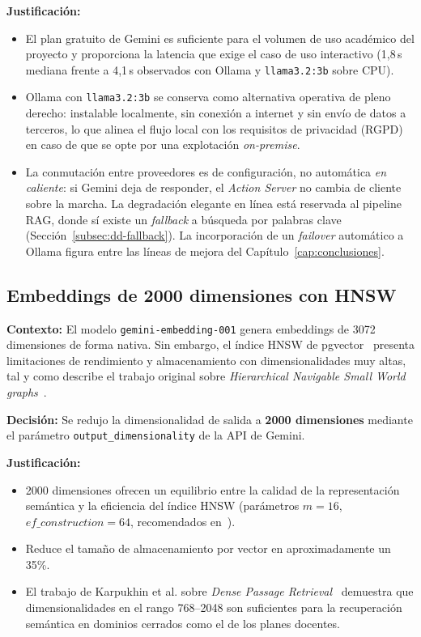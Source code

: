 \textbf{Justificación:}
\begin{itemize}
    \item El plan gratuito de Gemini es suficiente para el volumen de uso académico del proyecto y proporciona la latencia que exige el caso de uso interactivo (1,8\,s mediana frente a 4,1\,s observados con Ollama y \texttt{llama3.2:3b} sobre CPU).
    \item Ollama con \texttt{llama3.2:3b} se conserva como alternativa operativa de pleno derecho: instalable localmente, sin conexión a internet y sin envío de datos a terceros, lo que alinea el flujo local con los requisitos de privacidad (RGPD) en caso de que se opte por una explotación \textit{on-premise}.
    \item La conmutación entre proveedores es de configuración, no automática \textit{en caliente}: si Gemini deja de responder, el \textit{Action Server} no cambia de cliente sobre la marcha. La degradación elegante en línea está reservada al pipeline RAG, donde sí existe un \textit{fallback} a búsqueda por palabras clave (Sección~\ref{subsec:dd-fallback}). La incorporación de un \textit{failover} automático a Ollama figura entre las líneas de mejora del Capítulo~\ref{cap:conclusiones}.
\end{itemize}

\subsection{Embeddings de 2000 dimensiones con HNSW}\label{subsec:dd-embeddings}

\textbf{Contexto:} El modelo \texttt{gemini-embedding-001} genera embeddings de 3072 dimensiones de forma nativa. Sin embargo, el índice HNSW de pgvector~\cite{pgvectorgithub} presenta limitaciones de rendimiento y almacenamiento con dimensionalidades muy altas, tal y como describe el trabajo original sobre \textit{Hierarchical Navigable Small World graphs}~\cite{malkov2018hnsw}.

\textbf{Decisión:} Se redujo la dimensionalidad de salida a \textbf{2000 dimensiones} mediante el parámetro \texttt{output\_dimensionality} de la API de Gemini.

\textbf{Justificación:}
\begin{itemize}
    \item 2000 dimensiones ofrecen un equilibrio entre la calidad de la representación semántica y la eficiencia del índice HNSW (parámetros $m=16$, $ef\_construction=64$, recomendados en~\cite{malkov2018hnsw}).
    \item Reduce el tamaño de almacenamiento por vector en aproximadamente un 35\%.
    \item El trabajo de Karpukhin et al. sobre \textit{Dense Passage Retrieval}~\cite{karpukhin2020dpr} demuestra que dimensionalidades en el rango 768--2048 son suficientes para la recuperación semántica en dominios cerrados como el de los planes docentes.
\end{itemize}

